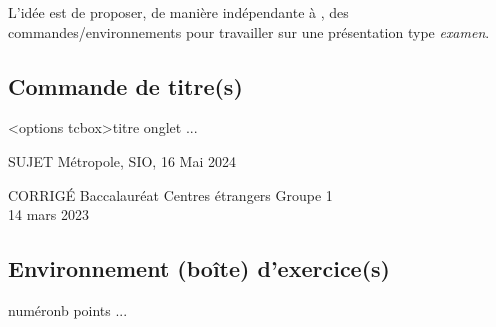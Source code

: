 \documentclass[french,11pt,a4paper]{article}
\begin{document}
L'idée est de proposer, de manière indépendante à , des commandes/environnements pour travailler sur une présentation type \textit{examen}.

\subsection{Commande de titre(s)}

\begin{codehigh}[language=latex/latex2]
\begin{TitreSujet}[Couleur=...,AlignH=...]<options tcbox>{titre onglet}
...
\end{TitreSujet}
\end{codehigh}

\begin{demohigh}[language=latex/latex2]
\begin{TitreSujet}[Couleur=red!50!black]{SUJET}
Métropole, SIO, 16 Mai 2024
\end{TitreSujet}
\end{demohigh}

\begin{demohigh}[language=latex/latex2]
\begin{TitreSujet}[Couleur=teal,AlignH=center]{CORRIGÉ}
Baccalauréat Centres étrangers Groupe 1\\
14 mars 2023
\end{TitreSujet}
\end{demohigh}

\begin{codehigh}[language=latex/latex2]
\end{codehigh}

\begin{demohigh}[language=latex/latex2]

\end{demohigh}

\subsection{Environnement (boîte) d'exercice(s)}

\begin{codehigh}[language=latex/latex2]
\begin{ExamExercice}{numéro}{nb points}
...
\end{ExamExercice}
\end{codehigh}
\end{document}
